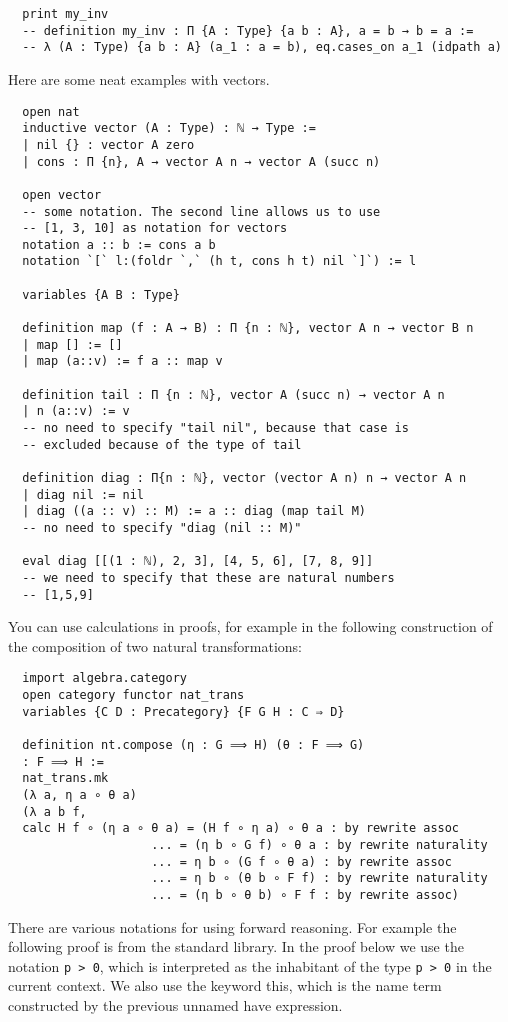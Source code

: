 \documentclass[11pt]{amsart}  %
\begin{document}
\begin{enumerate}
\begin{lstlisting}
  print my_inv
  -- definition my_inv : Π {A : Type} {a b : A}, a = b → b = a :=
  -- λ (A : Type) {a b : A} (a_1 : a = b), eq.cases_on a_1 (idpath a)
\end{lstlisting}
  Here are some neat examples with vectors.

\begin{lstlisting}
  open nat
  inductive vector (A : Type) : ℕ → Type :=
  | nil {} : vector A zero
  | cons : Π {n}, A → vector A n → vector A (succ n)
 
  open vector
  -- some notation. The second line allows us to use
  -- [1, 3, 10] as notation for vectors
  notation a :: b := cons a b
  notation `[` l:(foldr `,` (h t, cons h t) nil `]`) := l
 
  variables {A B : Type}
 
  definition map (f : A → B) : Π {n : ℕ}, vector A n → vector B n
  | map [] := []
  | map (a::v) := f a :: map v
 
  definition tail : Π {n : ℕ}, vector A (succ n) → vector A n
  | n (a::v) := v
  -- no need to specify "tail nil", because that case is
  -- excluded because of the type of tail
 
  definition diag : Π{n : ℕ}, vector (vector A n) n → vector A n
  | diag nil := nil
  | diag ((a :: v) :: M) := a :: diag (map tail M)
  -- no need to specify "diag (nil :: M)"
 
  eval diag [[(1 : ℕ), 2, 3], [4, 5, 6], [7, 8, 9]]
  -- we need to specify that these are natural numbers
  -- [1,5,9]
\end{lstlisting}

You can use calculations in proofs, for example in the following construction of the composition of two natural transformations:

\begin{lstlisting}
  import algebra.category
  open category functor nat_trans
  variables {C D : Precategory} {F G H : C ⇒ D}
 
  definition nt.compose (η : G ⟹ H) (θ : F ⟹ G)
  : F ⟹ H :=
  nat_trans.mk
  (λ a, η a ∘ θ a)
  (λ a b f,
  calc H f ∘ (η a ∘ θ a) = (H f ∘ η a) ∘ θ a : by rewrite assoc
                    ... = (η b ∘ G f) ∘ θ a : by rewrite naturality
                    ... = η b ∘ (G f ∘ θ a) : by rewrite assoc
                    ... = η b ∘ (θ b ∘ F f) : by rewrite naturality
                    ... = (η b ∘ θ b) ∘ F f : by rewrite assoc)
\end{lstlisting}

There are various notations for using forward reasoning. For example the following proof is from the standard library.
In the proof below we use the notation \lstinline{p > 0}, which is interpreted as the inhabitant of the type \lstinline{p > 0}
in the current context. We also use the keyword this, which is the name term constructed by the previous unnamed have expression.


\end{enumerate}
\end{document}

